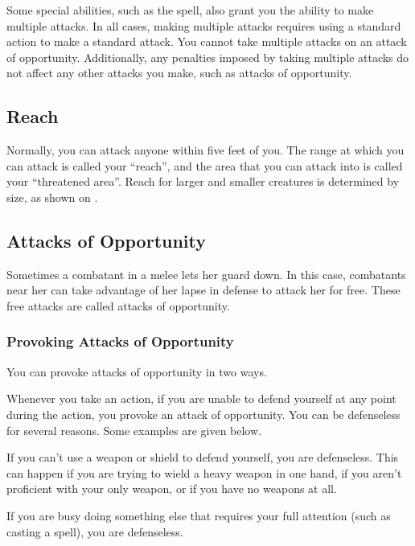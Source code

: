 Some special abilities, such as the  spell, also grant you the ability to make multiple attacks. In all cases, making multiple attacks requires using a standard action to make a standard attack. You cannot take multiple attacks on an attack of opportunity. Additionally, any penalties imposed by taking multiple attacks do not affect any other attacks you make, such as attacks of opportunity.

\subsection{Reach}\label{Reach}
Normally, you can attack anyone within five feet of you. The range at which you can attack is called your ``reach'', and the area that you can attack into is called your ``threatened area''. Reach for larger and smaller creatures is determined by size, as shown on .

\subsection{Attacks of Opportunity}\label{Attacks of Opportunity}
Sometimes a combatant in a melee lets her guard down. In this case, combatants near her can take advantage of her lapse in defense to attack her for free. These free attacks are called attacks of opportunity.

\subsubsection{Provoking Attacks of Opportunity}
You can provoke attacks of opportunity in two ways.

\label{Being Defenseless} Whenever you take an action, if you are unable to defend yourself at any point during the action, you provoke an attack of opportunity. You can be defenseless for several reasons. Some examples are given below.

\begin{itemize*}
    \item If you can't use a weapon or shield to defend yourself, you are defenseless. This can happen if you are trying to wield a heavy weapon in one hand, if you aren't proficient with your only weapon, or if you have no weapons at all. 
    \item If you are busy doing something else that requires your full attention (such as casting a spell), you are defenseless.
\end{itemize*}

